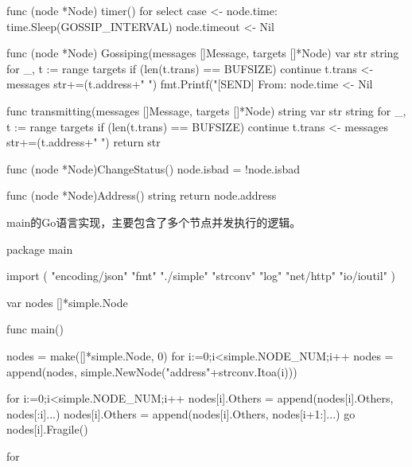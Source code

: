 \begin{codeblock}[language=GO]
	func (node *Node) timer() {
		for {
			select {
			case <- node.time:
				time.Sleep(GOSSIP_INTERVAL)
				node.timeout <- Nil{}
			}
		}
	}
	
	func (node *Node) Gossiping(messages []Message, targets []*Node) {
		var str string
		for _, t := range targets {
			if (len(t.trans) == BUFSIZE) {
				continue
			}
			t.trans <- messages
			str+=(t.address+" ")
		}
		fmt.Printf("[SEND] From: %
		node.time <- Nil{}
	}
	
	func transmitting(messages []Message, targets []*Node) string {
		var str string
		for _, t := range targets {
			if (len(t.trans) == BUFSIZE) {
				continue
			}
			t.trans <- messages
			str+=(t.address+" ")
		}
		return str
	}
	
	func (node *Node)ChangeStatus() {
		node.isbad = !node.isbad
	}
	
	func (node *Node)Address() string {
		return node.address
	}
\end{codeblock}

main的Go语言实现，主要包含了多个节点并发执行的逻辑。
\begin{codeblock}[language=GO]
	package main

	import (
		"encoding/json"
		"fmt"
		"./simple"
		"strconv"
		"log"
		"net/http"
		"io/ioutil"
	)
	
	var nodes []*simple.Node
	
	func main() {
		nodes = make([]*simple.Node, 0)
		for i:=0;i<simple.NODE_NUM;i++ {
			nodes = append(nodes, simple.NewNode("address"+strconv.Itoa(i)))
		}
	
		for i:=0;i<simple.NODE_NUM;i++ {
			nodes[i].Others = append(nodes[i].Others, nodes[:i]...)
			nodes[i].Others = append(nodes[i].Others, nodes[i+1:]...)
			go nodes[i].Fragile()
		}
	
		for {
		}
	}
\end{codeblock}

